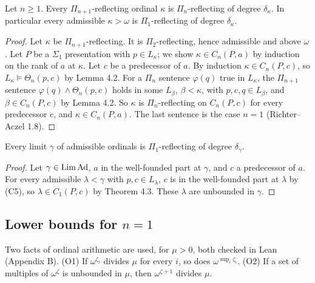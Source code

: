 \documentclass[11pt]{article}
\begin{document}
\begin{statement} Let $n \ge 1$. Every $\Pi_{n+1}$-reflecting ordinal $\kappa$ is
$\Pi_n$-reflecting of degree $\delta_\kappa$. In particular every admissible $\kappa > \omega$ is $\Pi_1$-reflecting of
degree $\delta_\kappa$.
\end{statement}

\begin{proof}
Let $\kappa$ be $\Pi_{n+1}$-reflecting. It is $\Pi_2$-reflecting, hence admissible and above $\omega$. Let $P$ be a
$\Sigma_1$ presentation with $p \in L_\kappa$; we show $\kappa \in C_n(P,a)$ by induction on the rank of $a$ at
$\kappa$. Let $c$ be a predecessor of $a$. By induction $\kappa \in C_n(P,c)$, so $L_\kappa \models \Theta_n(p,c)$ by
Lemma 4.2. For a $\Pi_n$ sentence $\varphi(q)$ true in $L_\kappa$, the $\Pi_{n+1}$ sentence $\varphi(q) \wedge
\Theta_n(p,c)$ holds in some $L_\beta$, $\beta < \kappa$, with $p, c, q \in L_\beta$, and $\beta \in C_n(P,c)$ by Lemma
4.2. So $\kappa$ is $\Pi_n$-reflecting on $C_n(P,c)$ for every predecessor $c$, and $\kappa \in C_n(P,a)$. The last
sentence is the case $n = 1$ (Richter--Aczel 1.8).
\end{proof}

\begin{statement} Every limit $\gamma$ of admissible ordinals is $\Pi_1$-reflecting of degree
$\delta_\gamma$.
\end{statement}

\begin{proof}
Let $\gamma \in \mathrm{Lim}\, \mathrm{Ad}$, $a$ in the well-founded part at $\gamma$, and $c$ a predecessor of $a$. For every admissible
$\lambda < \gamma$ with $p, c \in L_\lambda$, $c$ is in the well-founded part at $\lambda$ by (C5), so $\lambda \in
C_1(P,c)$ by Theorem 4.3. These $\lambda$ are unbounded in $\gamma$.
\end{proof}

\subsection{\texorpdfstring{Lower bounds for $n = 1$}{Lower bounds for n = 1}}

Two facts of ordinal arithmetic are used, for $\mu > 0$, both checked in Lean (Appendix B). (O1) If $\omega^{\zeta_i}$
divides $\mu$ for every $i$, so does $\omega^{\sup_i \zeta_i}$. (O2) If a set of multiples of $\omega^\zeta$ is
unbounded in $\mu$, then $\omega^{\zeta+1}$ divides $\mu$.
\end{document}
